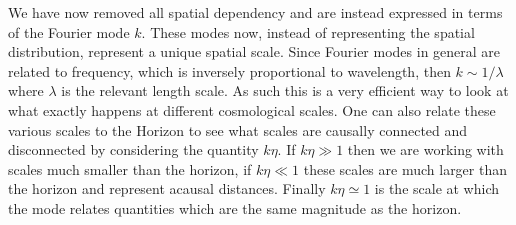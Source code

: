 \documentclass[%
reprint,
 amsmath,amssymb,
 aps,
]{revtex4-2}
\begin{document}
We have now removed all spatial dependency and are instead expressed in terms of the Fourier mode $k$. These modes now, instead of representing the spatial distribution, represent a unique spatial scale. Since Fourier modes in general are related to frequency, which is inversely proportional to wavelength, then $k\sim 1/\lambda$ where $\lambda$ is the relevant length scale. As such this is a very efficient way to look at what exactly happens at different cosmological scales. One can also relate these various scales to the Horizon to see what scales are causally connected and disconnected by considering the quantity $k\eta$. If $k\eta\gg1$ then we are working with scales much smaller than the horizon, if $k\eta\ll1$ these scales are much larger than the horizon and represent acausal distances. Finally $k\eta\simeq1$ is the scale at which the mode relates quantities which are the same magnitude as the horizon.
\end{document}
